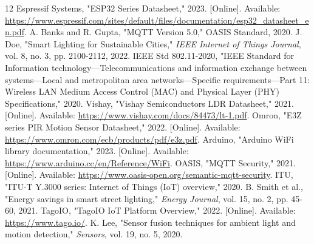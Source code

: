 \documentclass[12pt, a4paper]{article}
\begin{document}
\begin{thebibliography}{12}
 Espressif Systems, "ESP32 Series Datasheet," 2023. [Online]. Available: \url{https://www.espressif.com/sites/default/files/documentation/esp32_datasheet_en.pdf}.
 A. Banks and R. Gupta, "MQTT Version 5.0," OASIS Standard, 2020.
 J. Doe, "Smart Lighting for Sustainable Cities," \emph{IEEE Internet of Things Journal}, vol. 8, no. 3, pp. 2100-2112, 2022.
 IEEE Std 802.11-2020, "IEEE Standard for Information technology—Telecommunications and information exchange between systems—Local and metropolitan area networks—Specific requirements—Part 11: Wireless LAN Medium Access Control (MAC) and Physical Layer (PHY) Specifications," 2020.
 Vishay, "Vishay Semiconductors LDR Datasheet," 2021. [Online]. Available: \url{https://www.vishay.com/docs/84473/lt-1.pdf}.
 Omron, "E3Z series PIR Motion Sensor Datasheet," 2022. [Online]. Available: \url{https://www.omron.com/ecb/products/pdf/e3z.pdf}.
 Arduino, "Arduino WiFi library documentation," 2023. [Online]. Available: \url{https://www.arduino.cc/en/Reference/WiFi}.
 OASIS, "MQTT Security," 2021. [Online]. Available: \url{https://www.oasis-open.org/semantic-mqtt-security}.
 ITU, "ITU-T Y.3000 series: Internet of Things (IoT) overview," 2020.
 B. Smith et al., "Energy savings in smart street lighting," \emph{Energy Journal}, vol. 15, no. 2, pp. 45-60, 2021.
 TagoIO, "TagoIO IoT Platform Overview," 2022. [Online]. Available: \url{https://www.tago.io/}.
 K. Lee, "Sensor fusion techniques for ambient light and motion detection," \emph{Sensors}, vol. 19, no. 5, 2020.
\end{thebibliography}
\end{document}
